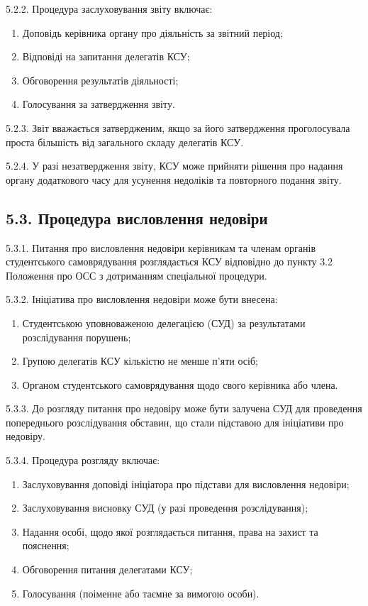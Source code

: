     5.2.2. Процедура заслуховування звіту включає:

        \begin{enumerate}[label=\alph*)]
            \item Доповідь керівника органу про діяльність за звітний період;
            \item Відповіді на запитання делегатів КСУ;
            \item Обговорення результатів діяльності;
            \item Голосування за затвердження звіту.
        \end{enumerate}

    5.2.3. Звіт вважається затвердженим, якщо за його затвердження проголосувала проста більшість від загального складу делегатів КСУ.

    5.2.4. У разі незатвердження звіту, КСУ може прийняти рішення про надання органу додаткового часу для усунення недоліків та повторного подання звіту.

\subsection*{5.3. Процедура висловлення недовіри}
    5.3.1. Питання про висловлення недовіри керівникам та членам органів студентського самоврядування розглядається КСУ відповідно до пункту 3.2 Положення про ОСС з дотриманням спеціальної процедури.

    5.3.2. Ініціатива про висловлення недовіри може бути внесена:

        \begin{enumerate}[label=\alph*)]
            \item Студентською уповноваженою делегацією (СУД) за результатами розслідування порушень;
            \item Групою делегатів КСУ кількістю не менше п'яти осіб;
            \item Органом студентського самоврядування щодо свого керівника або члена.
        \end{enumerate}

    5.3.3. До розгляду питання про недовіру може бути залучена СУД для проведення попереднього розслідування обставин, що стали підставою для ініціативи про недовіру.

    5.3.4. Процедура розгляду включає:

        \begin{enumerate}[label=\alph*)]
            \item Заслуховування доповіді ініціатора про підстави для висловлення недовіри;
            \item Заслуховування висновку СУД (у разі проведення розслідування);
            \item Надання особі, щодо якої розглядається питання, права на захист та пояснення;
            \item Обговорення питання делегатами КСУ;
            \item Голосування (поіменне або таємне за вимогою особи).
        \end{enumerate}


